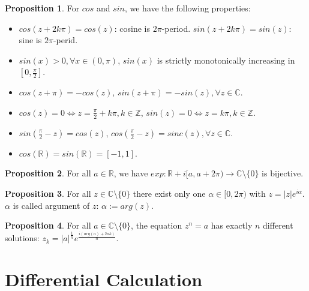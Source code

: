 \documentclass{article}
\theoremstyle{definition}
\newtheorem{prop}{Proposition}[subsection]
\begin{document}
\begin{prop}
For $cos$ and $sin$, we have the following properties:
\begin{itemize}
    \item $cos(z+2k\pi)=cos(z)$: cosine is $2\pi$-period. $sin(z+2k\pi)=sin(z)$: sine is $2\pi$-perid.
    \item $sin(x)>0, \forall x\in(0,\pi)$, $sin(x)$ is strictly monotonically increasing in $[0, \frac{\pi}{2}]$.
    \item $cos(z+\pi)=-cos(z)$, $sin(z+\pi)=-sin(z), \forall z\in\mathbb{C}$.
    \item $cos(z)=0 \Leftrightarrow z=\frac{\pi}{2}+k\pi, k\in\mathbb{Z}$, $sin(z)=0 \Leftrightarrow z=k\pi, k\in\mathbb{Z}$.
    \item $sin(\frac{\pi}{2}-z)=cos(z)$, $cos(\frac{\pi}{2}-z)=sinc(z), \forall z\in\mathbb{C}$.
    \item $cos(\mathbb{R})=sin(\mathbb{R})=[-1,1]$.
\end{itemize}
\end{prop}
\begin{prop}
For all $a\in\mathbb{R}$, we have $exp: \mathbb{R}+i[a,a+2\pi) \to \mathbb{C}\texttt{\textbackslash}\{0\}$ is bijective.
\end{prop}
\begin{prop}
For all $z\in\mathbb{C}\texttt{\textbackslash}\{0\}$ there exist only one $\alpha\in[0,2\pi)$ with $z=|z|e^{i\alpha}$. $\alpha$ is called argument of $z$: $\alpha:=arg(z)$.
\end{prop}
\begin{prop}
For all $a\in\mathbb{C}\texttt{\textbackslash}\{0\}$, the equation $z^n=a$ has exactly $n$ different solutions: $z_k=|a|^{\frac{1}{n}}e^{\frac{i(arg(a)+2\pi k)}{n}}$.
\end{prop}
\section{Differential Calculation}
\end{document}
